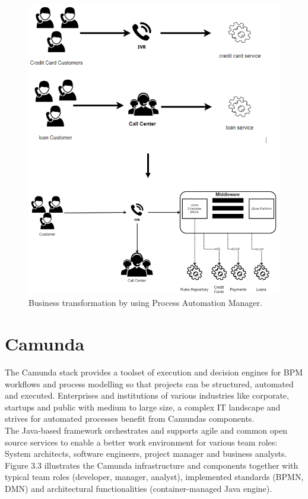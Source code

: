 \begin{figure}[!hb]
	\centering
	\includegraphics[scale=0.6]{RedHatnew}
	\caption{Business transformation by using Process Automation Manager.}
\end{figure}


\newpage
\section{Camunda}
The Camunda stack provides a toolset of execution and decision engines for BPM workflows and process modelling so that projects can be structured, automated and executed. Enterprises and institutions of various industries like corporate, startups and public with medium to large size, a complex IT landscape and strives for automated processes benefit from Camundas components. \cite{RobertGimbel.20.2.2019} \\
The Java-based framework orchestrates and supports agile and common open source services to enable a better work environment for various team roles: System architects, software engineers, project manager and business analysts. Figure 3.3 illustrates the Camunda infrastructure and components together with typical team roles (developer, manager, analyst), implemented standards (BPMN, DMN) and architectural functionalities (container-managed Java engine). \cite{CamundaServicesGmbH.2019}

